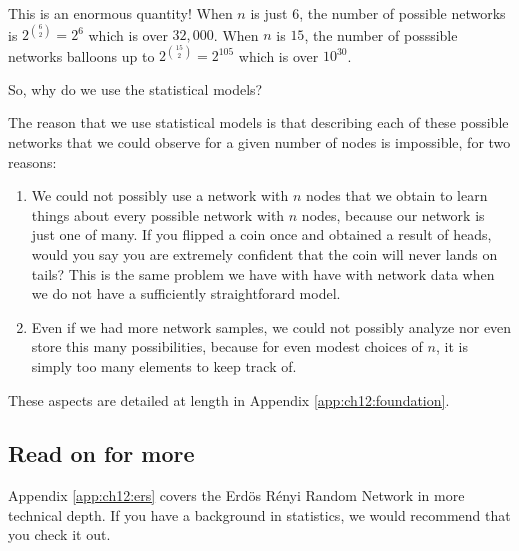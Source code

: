 This is an enormous quantity! When $n$ is just $6$, the number of possible networks is $2^{\binom 6 2} = 2^{6}$ which is over $32,000$. When $n$ is $15$, the number of posssible networks balloons up to $2^{\binom{15}{2}} = 2^{105}$ which is over $10^{30}$.

\begin{floatingbox}[h]\caption{So, why do we use the statistical models?}
\label{box:ch5:whyuse}
The reason that we use statistical models is that describing each of these possible networks that we could observe for a given number of nodes is {impossible}, for two reasons:
\begin{enumerate}
    \item We could not possibly use a network with $n$ nodes that we obtain to learn things about every possible network with $n$ nodes, because our network is just one of many. If you flipped a coin once and obtained a result of heads, would you say you are extremely confident that the coin will never lands on tails? This is the same problem we have with have with network data when we do not have a sufficiently straightforard model.
    \item Even if we had more network samples, we could not possibly analyze nor even store this many possibilities, because for even modest choices of $n$, it is simply too many elements to keep track of.
\end{enumerate}
These aspects are detailed at length in Appendix \ref{app:ch12:foundation}.
\end{floatingbox}

\subsection{Read on for more}

Appendix \ref{app:ch12:ers} covers the Erd\"os R\'enyi Random Network in more technical depth. If you have a background in statistics, we would recommend that you check it out.

\newpage